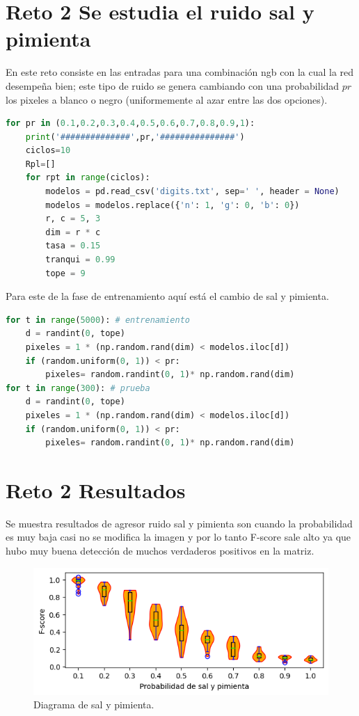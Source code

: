 \documentclass{article}
\begin{document}
\newpage

\section{Reto 2 Se estudia el ruido sal y pimienta}\label{}
En este reto consiste en las entradas para una combinación ngb con la cual la red desempeña bien; este tipo de ruido se genera cambiando con una probabilidad $pr$ los pixeles a blanco o negro (uniformemente al azar entre las dos opciones).

\begin{lstlisting}[caption=Se fijan los valores con el mismo ciclo, language=Python]
for pr in (0.1,0.2,0.3,0.4,0.5,0.6,0.7,0.8,0.9,1):
    print('##############',pr,'###############')
    ciclos=10
    Rpl=[]
    for rpt in range(ciclos):
        modelos = pd.read_csv('digits.txt', sep=' ', header = None)
        modelos = modelos.replace({'n': 1, 'g': 0, 'b': 0})
        r, c = 5, 3
        dim = r * c
        tasa = 0.15
        tranqui = 0.99
        tope = 9
\end{lstlisting}

Para este de la fase de entrenamiento aquí está el cambio de sal y pimienta.
\begin{lstlisting}[caption=Fijamos los valores, language=Python]
for t in range(5000): # entrenamiento
    d = randint(0, tope)
    pixeles = 1 * (np.random.rand(dim) < modelos.iloc[d])
    if (random.uniform(0, 1)) < pr:
        pixeles= random.randint(0, 1)* np.random.rand(dim)
for t in range(300): # prueba
    d = randint(0, tope)
    pixeles = 1 * (np.random.rand(dim) < modelos.iloc[d])
    if (random.uniform(0, 1)) < pr:
        pixeles= random.randint(0, 1)* np.random.rand(dim)
\end{lstlisting}

\section{Reto 2 Resultados}\label{}
Se muestra resultados de agresor ruido sal y pimienta son cuando la probabilidad es muy baja casi no se modifica la imagen y por lo tanto F-score sale alto ya que hubo muy buena detección de muchos verdaderos positivos en la matriz. 

\begin{figure}
    \centering
    \includegraphics[width=195mm]{Figure_4.png}
    \caption{Diagrama de sal y pimienta.}
    \label{figure}
\end{figure}

\newpage


\end{document}
